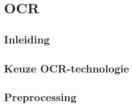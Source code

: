 
\chapter{OCR}
\label{ch:ocr}


\section{Inleiding}
\label{sec:inleiding-ocr}


\section{Keuze OCR-technologie}
\label{sec:keuze-ocr-technologie}


\section{Preprocessing}
\label{sec:preprocessing}

